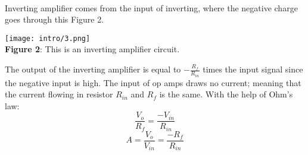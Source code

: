 \documentclass[11pt]{article}
\begin{document}
\\Inverting amplifier comes from the input of inverting, where the negative charge goes through this Figure 2. 
\begin{center}
    \texttt{[image: intro/3.png]}\\\textbf{Figure 2}: This is an inverting amplifier circuit.
\end{center}
The output of the inverting amplifier is equal to $-\frac{R_f}{R_{in}}$ times the input signal since the negative input is high. The input of op amps draws no current; meaning that the current flowing in resistor $R_{in}$ and $R_f$ is the same. With the help of Ohm's law:
\begin{equation}
    \frac{V_o}{R_f}=\frac{-V_{in}}{R_{in}}
\end{equation}
\begin{equation}
    A=\frac{V_o}{V_{in}}=\frac{-R_f}{R_{in}}
\end{equation}
\end{document}
